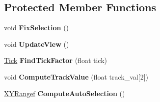 \subsection*{Protected Member Functions}
\begin{DoxyCompactItemize}
\item 
void {\bfseries Fix\+Selection} ()\hypertarget{classpangolin_1_1_plotter_a5c69ca9bb07a6625c5157f93fdccaf74}{}\label{classpangolin_1_1_plotter_a5c69ca9bb07a6625c5157f93fdccaf74}

\item 
void {\bfseries Update\+View} ()\hypertarget{classpangolin_1_1_plotter_a0317818cfe148efae2241e2a02fc4ed5}{}\label{classpangolin_1_1_plotter_a0317818cfe148efae2241e2a02fc4ed5}

\item 
\hyperlink{structpangolin_1_1_plotter_1_1_tick}{Tick} {\bfseries Find\+Tick\+Factor} (float tick)\hypertarget{classpangolin_1_1_plotter_a428425f6caf99125544ba86a93189409}{}\label{classpangolin_1_1_plotter_a428425f6caf99125544ba86a93189409}

\item 
void {\bfseries Compute\+Track\+Value} (float track\+\_\+val\mbox{[}2\mbox{]})\hypertarget{classpangolin_1_1_plotter_a7af97ee38c37bd5eaabe71c5a9606b03}{}\label{classpangolin_1_1_plotter_a7af97ee38c37bd5eaabe71c5a9606b03}

\item 
\hyperlink{structpangolin_1_1_x_y_range}{X\+Y\+Rangef} {\bfseries Compute\+Auto\+Selection} ()\hypertarget{classpangolin_1_1_plotter_a3a851d58352191a3eae4d7d0f16f1102}{}\label{classpangolin_1_1_plotter_a3a851d58352191a3eae4d7d0f16f1102}

\end{DoxyCompactItemize}
